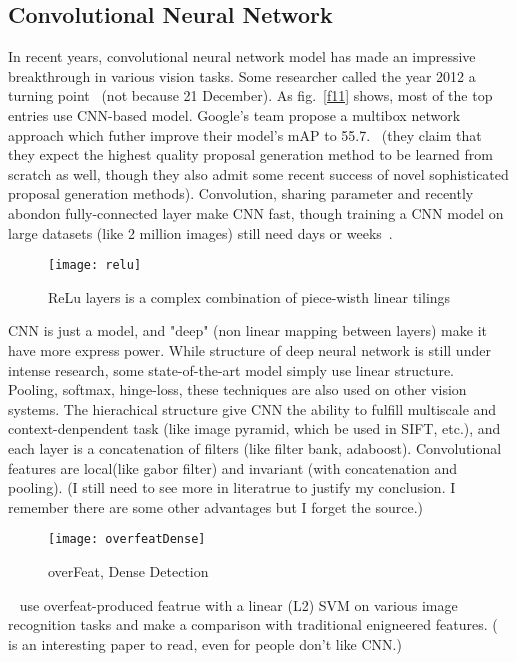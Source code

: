 \documentclass[12pt]{article}
\begin{document}
\subsection{Convolutional Neural Network}
In recent years, convolutional neural network model has made an impressive breakthrough in various vision tasks. Some researcher called the year 2012 a turning point~\citep{ILSVRC} (not because 21 December). As fig.~\ref{f11} shows, most of the top entries use CNN-based model. Google's team propose a multibox network approach which futher improve their model's mAP to 55.7.~\citep{GoogleDL} (they claim that they expect the highest quality proposal generation method to be learned from scratch as well, though they also admit some recent success of novel sophisticated proposal generation methods). Convolution, sharing parameter and recently abondon fully-connected layer make CNN fast, though training a CNN model on large datasets (like 2 million images) still need days or weeks~\citep{zhou2014learning}. 

\begin{figure}
\centering
\texttt{[image: relu]}
\caption{ReLu layers is a complex combination of piece-wisth linear tilings~\citep{supervisedDeepL}}
\end{figure}

CNN is just a model, and "deep" (non linear mapping between layers) make it have more express power. While structure of deep neural network is still under intense research, some state-of-the-art model simply use linear structure. ~\citep{GoogleLeNet} Pooling, softmax, hinge-loss, these techniques are also used on other vision systems. The hierachical structure give CNN the ability to fulfill multiscale and context-denpendent task (like image pyramid, which be used in SIFT, etc.), and each layer is a concatenation of filters (like filter bank, adaboost). Convolutional features are local(like gabor filter) and invariant (with concatenation and pooling). (I still need to see more in literatrue to justify my conclusion. I remember there are some other advantages but I forget the source.) 


\begin{figure}
\texttt{[image: overfeatDense]}
\caption{overFeat, Dense Detection~\citep{key}}
\end{figure}

~\citep{CNNoff-the-shelf} use overfeat-produced featrue with a linear (L2) SVM on various image recognition tasks and make a comparison with traditional enigneered features. (~\citep{CNNoff-the-shelf} is an interesting paper to read, even for people don't like CNN.)
\end{document}
